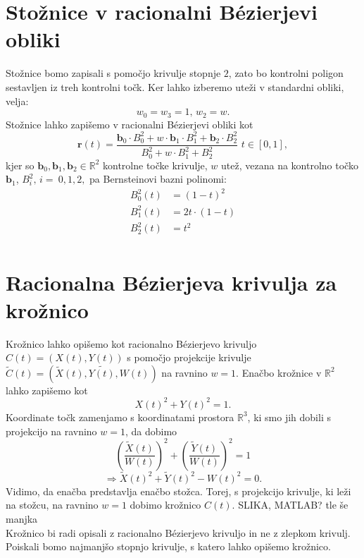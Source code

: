 \documentclass[a4paper,11pt]{article}
\theoremstyle{definition}
\theoremstyle{plain}
\begin{document}
\section{Stožnice v racionalni B\'ezierjevi obliki}
Stožnice bomo zapisali s pomočjo krivulje stopnje $2$, zato bo kontrolni poligon sestavljen iz treh kontrolni točk. Ker lahko izberemo uteži v standardni obliki, velja: $$w_0=w_3=1,\,w_2=w.$$
Stožnice lahko zapišemo v racionalni B\'ezierjevi obliki kot 
$$\boldsymbol{r}(t)=\frac{\boldsymbol{b}_0\cdot B_0^2+w\cdot\boldsymbol{b}_1\cdot B_1^2+\boldsymbol{b}_2\cdot B_2^2}{ B_0^2+w\cdot B_1^2+ B_2^2}\,\, t\in[0,1],$$
kjer so $\boldsymbol{b}_0, \boldsymbol{b}_1, \boldsymbol{b}_2 \in \mathbb{R}^2$ kontrolne točke krivulje, $w$ utež, vezana na kontrolno točko $\boldsymbol{b}_1$, $B_i^2,\,i=~0,1,2,$ pa Bernsteinovi bazni polinomi:
\begin{align*}
B_0^2(t) &= (1-t)^2 \\
B_1^2(t) &= 2t\cdot(1-t) \\
B_2^2(t) &= t^2 \\
\end{align*}



\section{Racionalna B\'ezierjeva krivulja za krožnico}
Krožnico lahko opišemo kot racionalno B\'ezierjevo krivuljo $C(t)=(X(t),Y(t))$ s pomočjo projekcije krivulje $\tilde{C}(t)=(\tilde{X}(t), \tilde{Y(t)}, W(t))$ na ravnino $w=1$. 
Enačbo krožnice v $\mathbb{R}^2$ lahko zapišemo kot
$$X(t)^2+Y(t)^2=1.$$
Koordinate točk zamenjamo s koordinatami prostora $\mathbb{R}^3$, ki smo jih dobili s projekcijo na ravnino $w=1$, da dobimo
$$\left(\frac{\tilde{X}(t)}{W(t)}\right)^2+\left(\frac{\tilde{Y}(t)}{W(t)}\right)^2=1$$
$$\Rightarrow \tilde{X}(t)^2+\tilde{Y}(t)^2-W(t)^2=0.$$
Vidimo, da enačba predstavlja enačbo stožca. Torej, s projekcijo krivulje, ki leži na stožcu, na ravnino $w=1$ dobimo krožnico $C(t)$.
SLIKA, MATLAB?
tle še manjka \\

Krožnico bi radi opisali z racionalno B\'ezierjevo krivuljo in ne z zlepkom krivulj. Poiskali bomo najmanjšo stopnjo krivulje, s katero lahko opišemo krožnico. 
\end{document}
